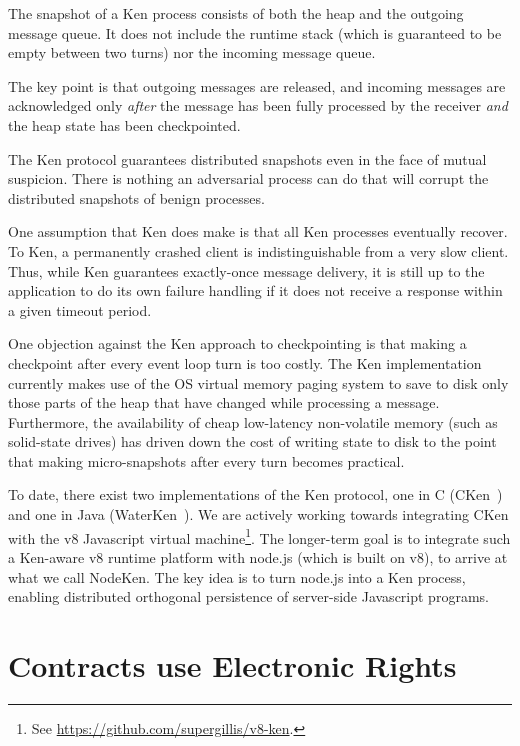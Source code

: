 \documentclass{llncs}
\begin{document}
The snapshot of a Ken process consists of both the heap and the outgoing message queue. It does not include the runtime stack (which is guaranteed to be empty between two turns) nor the incoming message queue.

The key point is that outgoing messages are released, and incoming messages are acknowledged only \emph{after} the message has been fully processed by the receiver \emph{and} the heap state has been checkpointed.

The Ken protocol guarantees distributed snapshots even in the face of mutual suspicion. There is nothing an adversarial process can do that will corrupt the distributed snapshots of benign processes.

One assumption that Ken does make is that all Ken processes eventually recover. To Ken, a permanently crashed client is indistinguishable from a very slow client. Thus, while Ken guarantees exactly-once message delivery, it is still up to the application to do its own failure handling if it does not receive a response within a given timeout period.

One objection against the Ken approach to checkpointing is that making a checkpoint after every event loop turn is too costly. The Ken implementation currently makes use of the OS virtual memory paging system to save to disk only those parts of the heap that have changed while processing a message. Furthermore, the availability of cheap low-latency non-volatile memory (such as solid-state drives) has driven down the cost of writing state to disk to the point that making micro-snapshots after every turn becomes practical.

To date, there exist two implementations of the Ken protocol, one in C (CKen~\cite{Yoo:CKen}) and one in Java (WaterKen~\cite{waterken}). We are actively working towards integrating CKen with the v8 Javascript virtual machine\footnote{See \url{https://github.com/supergillis/v8-ken}.}. The longer-term goal is to integrate such a Ken-aware v8 runtime platform with node.js (which is built on v8), to arrive at what we call NodeKen. The key idea is to turn node.js into a Ken process, enabling distributed orthogonal persistence of server-side Javascript programs.


\section{Contracts use Electronic Rights}
\end{document}
